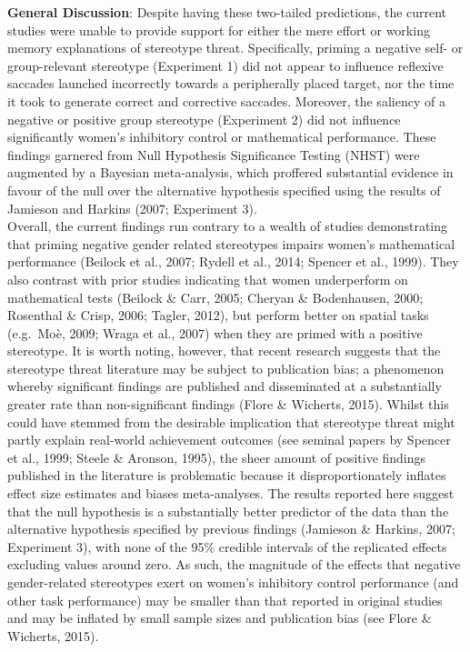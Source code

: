 \documentclass[
  doc, a4paper]{apa7}
\begin{document}
\textbf{General Discussion}:
Despite having these two-tailed predictions, the current studies were unable to provide support for either the mere effort or working memory explanations of stereotype threat. Specifically, priming a negative self- or group-relevant stereotype (Experiment 1) did not appear to influence reflexive saccades launched incorrectly towards a peripherally placed target, nor the time it took to generate correct and corrective saccades. Moreover, the saliency of a negative or positive group stereotype (Experiment 2) did not influence significantly women's inhibitory control or mathematical performance. These findings garnered from Null Hypothesis Significance Testing (NHST) were augmented by a Bayesian meta-analysis, which proffered substantial evidence in favour of the null over the alternative hypothesis specified using the results of Jamieson and Harkins (2007; Experiment 3).\\
Overall, the current findings run contrary to a wealth of studies demonstrating that priming negative gender related stereotypes impairs women's mathematical performance (Beilock et al., 2007; Rydell et al., 2014; Spencer et al., 1999). They also contrast with prior studies indicating that women underperform on mathematical tests (Beilock \& Carr, 2005; Cheryan \& Bodenhausen, 2000; Rosenthal \& Crisp, 2006; Tagler, 2012), but perform better on spatial tasks (e.g.~Moè, 2009; Wraga et al., 2007) when they are primed with a positive stereotype. It is worth noting, however, that recent research suggests that the stereotype threat literature may be subject to publication bias; a phenomenon whereby significant findings are published and disseminated at a substantially greater rate than non-significant findings (Flore \& Wicherts, 2015). Whilst this could have stemmed from the desirable implication that stereotype threat might partly explain real-world achievement outcomes (see seminal papers by Spencer et al., 1999; Steele \& Aronson, 1995), the sheer amount of positive findings published in the literature is problematic because it disproportionately inflates effect size estimates and biases meta-analyses. The results reported here suggest that the null hypothesis is a substantially better predictor of the data than the alternative hypothesis specified by previous findings (Jamieson \& Harkins, 2007; Experiment 3), with none of the 95\% credible intervals of the replicated effects excluding values around zero. As such, the magnitude of the effects that negative gender-related stereotypes exert on women's inhibitory control performance (and other task performance) may be smaller than that reported in original studies and may be inflated by small sample sizes and publication bias (see Flore \& Wicherts, 2015).
\end{document}
